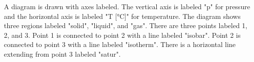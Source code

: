 A diagram is drawn with axes labeled. The vertical axis is labeled "p" for pressure and the horizontal axis is labeled "T [°C]" for temperature. The diagram shows three regions labeled "solid", "liquid", and "gas". There are three points labeled 1, 2, and 3. Point 1 is connected to point 2 with a line labeled "isobar". Point 2 is connected to point 3 with a line labeled "isotherm". There is a horizontal line extending from point 3 labeled "satur".